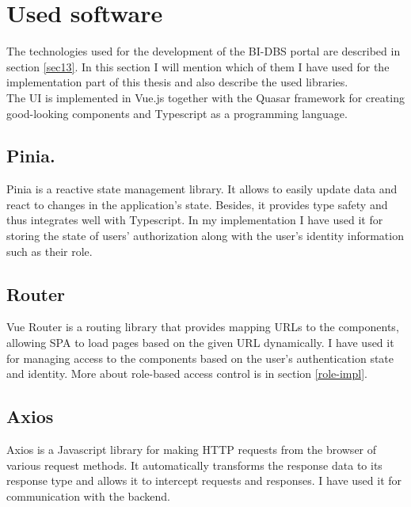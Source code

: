 \section{Used software} The technologies used for the development of the BI-DBS portal are described in section \ref{sec13}. In this section I will mention which of them I have used for the implementation part of this thesis and also describe the used libraries.\\
The UI is implemented in Vue.js \cite{vue-docs} together with the Quasar framework \cite{quasar-doc} for creating good-looking components and Typescript \cite{typescript-doc} as a programming language. 

\subsection{Pinia.} Pinia is a reactive state management library. It allows to easily update data and react to changes in the application's state. Besides, it provides type safety and thus integrates well with Typescript. In my implementation I have used it for storing the state of users' authorization along with the user's identity information such as their role. \cite{pinia-docs}

\subsection{Router} Vue Router is a routing library that provides mapping URLs to the components, allowing SPA to load pages based on the given URL dynamically. I have used it for managing access to the components based on the user's authentication state and identity. More about role-based access control is in section \ref{role-impl}. \cite{router-doc}

\subsection{Axios} Axios is a Javascript library for making HTTP requests from the browser of various request methods. It automatically transforms the response data to its response type and allows it to intercept requests and responses. I have used it for communication with the backend. \cite{axios-docs}

